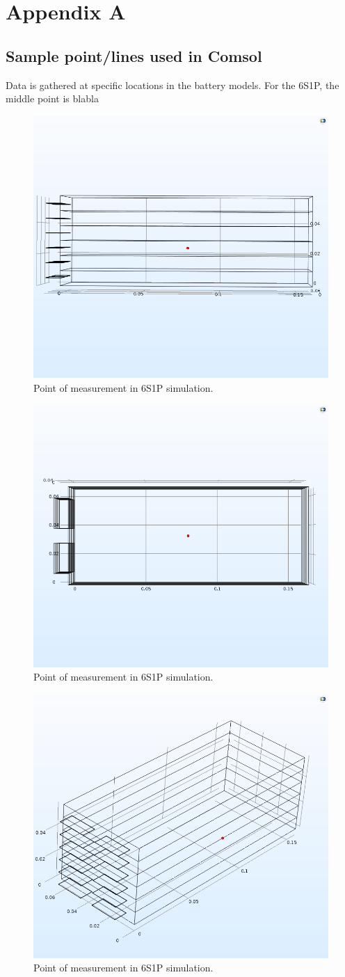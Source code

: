 \section{Appendix A}
\label{AppendixA}
\subsection{Sample point/lines used in Comsol}

Data is gathered at specific locations in the battery models.
For the 6S1P, the middle point is blabla
\begin{figure} [H]
	\centering
	\includegraphics[width=0.5\linewidth]{Figures/6_Point_in_3D.png}
	\caption{Point of measurement in 6S1P simulation.}
   \label{Fig:6_1}
\end{figure}
\begin{figure} [H]
	\centering
	\includegraphics[width=0.5\linewidth]{Figures/6_Point_in_3D_2.png}
	\caption{Point of measurement in 6S1P simulation.}
   \label{Fig:6_2}
\end{figure}

\begin{figure} [H]
	\centering
	\includegraphics[width=0.5\linewidth]{Figures/6_Point_in_3D_3.png}
	\caption{Point of measurement in 6S1P simulation.}
   \label{Fig:6_3}
\end{figure}

